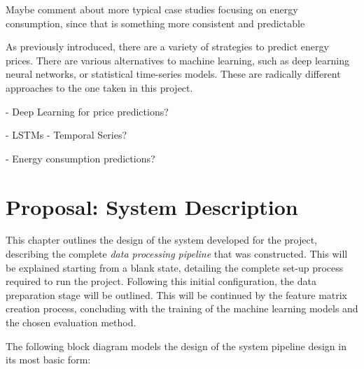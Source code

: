 \documentclass[12pt]{report} %
\begin{document}
Maybe comment about more typical case studies focusing on energy consumption, since that is something more consistent and predictable

As previously introduced, there are a variety of strategies to predict energy prices. There are various alternatives to machine learning, such as deep learning neural networks, or statistical time-series models. These are radically different approaches to the one taken in this project.

- Deep Learning for price predictions?

- LSTMs - Temporal Series?

- Energy consumption predictions?





\chapter{Proposal: System Description}

This chapter outlines the design of the system developed for the project, describing the complete \textit{data processing pipeline} that was constructed. This will be explained starting from a blank state, detailing the complete set-up process required to run the project. Following this initial configuration, the data preparation stage will be outlined. This will be continued by the feature matrix creation process, concluding with the training of the machine learning models and the chosen evaluation method.

The following block diagram models the design of the system pipeline design in its most basic form:


\end{document}
